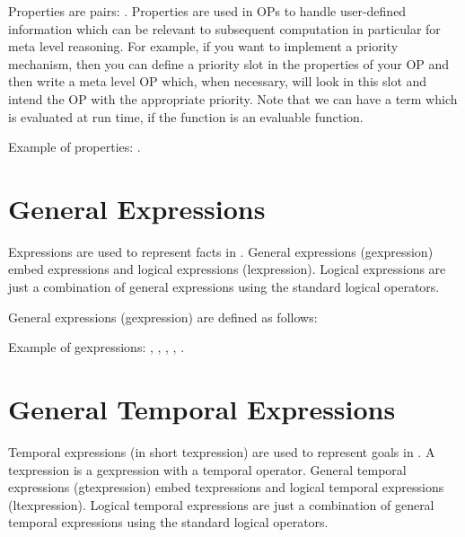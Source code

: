 Properties are pairs: . Properties are used in OPs to handle
user-defined information which can be relevant to subsequent computation in
particular for meta level reasoning. For example, if you want to implement a
priority mechanism, then you can define a priority slot in the properties of
your OP and then write a meta level OP which, when necessary, will look in this
slot and intend the OP with the appropriate priority.  Note that we can have a
term which is evaluated at run time, if the function is an evaluable
function.

Example of properties: .

\section{General Expressions}

Expressions are used to represent facts in \COPRS{}.  General expressions
(gexpression) embed expressions and logical expressions (lexpression). Logical
expressions are just a combination of general expressions using the standard
logical operators.

General expressions (gexpression) are defined as follows:

\noindent
{} \*
 \*
 \*
 \*

Example of gexpressions: \*
,\*
,\*
,\*
,\*
.

\section{General Temporal Expressions}


Temporal expressions (in short texpression) are used to represent goals in
\COPRS{}. A texpression is a gexpression with a temporal operator. General
temporal expressions (gtexpression) embed texpressions and logical temporal
expressions (ltexpression). Logical temporal expressions are just a combination
of general temporal expressions using the standard logical operators.

